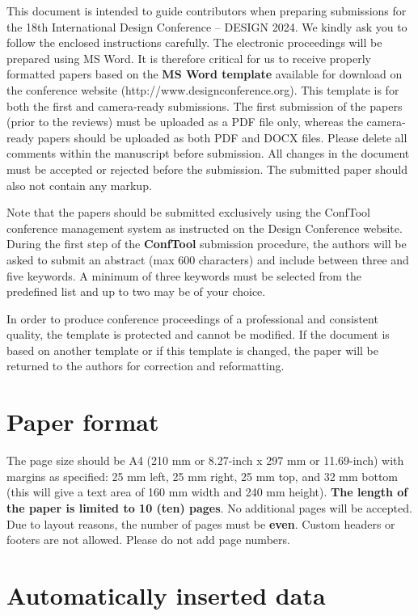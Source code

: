 \documentclass{design}
\begin{document}
This document is intended to guide contributors when preparing submissions for the 18th International Design Conference – DESIGN 2024. We kindly ask you to follow the enclosed instructions carefully. The electronic proceedings will be prepared using MS Word. It is therefore critical for us to receive properly formatted papers based on the \textbf{MS Word template} available for download on the conference website (http://www.designconference.org). This template is for both the first and camera-ready submissions. The first submission of the papers (prior to the reviews) must be uploaded as a PDF file only, whereas the camera-ready papers should be uploaded as both PDF and DOCX files.
Please delete all comments within the manuscript before submission. All changes in the document must be accepted or rejected before the submission. The submitted paper should also not contain any markup.

Note that the papers should be submitted exclusively using the ConfTool conference management system as instructed on the Design Conference website. During the first step of the \textbf{ConfTool} submission procedure, the authors will be asked to submit an abstract (max 600 characters) and include between three and five keywords. A minimum of three keywords must be selected from the predefined list and up to two may be of your choice.

In order to produce conference proceedings of a professional and consistent quality, the template is protected and cannot be modified. If the document is based on another template or if this template is changed, the paper will be returned to the authors for correction and reformatting.

\section{Paper format}

The page size should be A4 (210 mm or 8.27-inch x 297 mm or 11.69-inch) with margins as specified: 25 mm left, 25 mm right, 25 mm top, and 32 mm bottom (this will give a text area of 160 mm width and 240 mm height). \textbf{The length of the paper is limited to 10 (ten) pages}. No additional pages will be accepted. Due to layout reasons, the number of pages must be \textbf{even}. Custom headers or footers are not allowed. Please do not add page numbers.

\section{Automatically inserted data}
\end{document}
